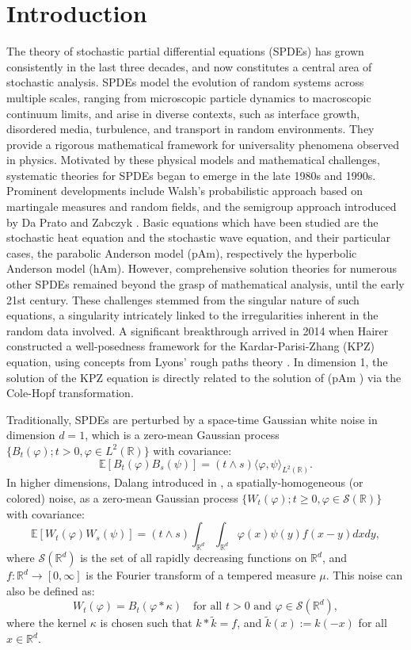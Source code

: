 \documentclass[12pt]{article}
\def\cS{\mathcal{S}}
\def\bE{\mathbb{E}}
\def\bR{\mathbb{R}}
\def\k{\kappa}
\begin{document}
\section{Introduction}

The theory of stochastic partial differential equations (SPDEs) has grown consistently in the last three decades, and now constitutes a central area of stochastic analysis. SPDEs model the evolution of random systems across multiple scales, ranging from microscopic particle dynamics to macroscopic continuum limits, and arise in diverse contexts, such as interface growth, disordered media, turbulence, and transport in random environments. They provide a rigorous mathematical framework for universality phenomena observed in physics. Motivated by these physical models and mathematical challenges, systematic theories for SPDEs began to emerge in the late 1980s and 1990s. Prominent developments include Walsh's \cite{walsh86} probabilistic approach based on martingale measures and random fields, and the semigroup approach introduced by Da Prato and Zabczyk \cite{DZ92}. Basic equations which have been studied are the stochastic heat equation and the stochastic wave equation, and their particular cases, the parabolic Anderson model (pAm), respectively the hyperbolic Anderson model (hAm). However, comprehensive solution theories for numerous other SPDEs
remained beyond the grasp of mathematical analysis, until the early 21st century. These challenges
stemmed from the singular nature of such equations, a singularity intricately linked to the irregularities inherent in the random data involved. A significant breakthrough arrived in 2014 when Hairer \cite{hairer14}
constructed a well-posedness framework for the Kardar-Parisi-Zhang (KPZ) equation, using concepts from Lyons' rough paths theory \cite{lyons98}. In dimension 1, the solution of the KPZ equation is directly related to the solution of (pAm
) via the Cole-Hopf transformation.


\medskip

Traditionally, SPDEs are perturbed by a space-time Gaussian white noise in dimension $d=1$, which is a zero-mean Gaussian process $\{B_t(\varphi);t> 0,\varphi \in L^2(\bR)\}$ with covariance:
\[
\bE[B_t(\varphi) B_s(\psi)]=(t \wedge s) \langle \varphi,\psi \rangle_{L^2(\bR)}.
\]
In higher dimensions, Dalang introduced in \cite{dalang99}, a spatially-homogeneous (or colored) noise, as a zero-mean Gaussian process $\{W_t(\varphi);t\geq 0,\varphi \in \cS(\bR)\}$ with covariance:
\begin{equation}
\label{def-cov-W}
\bE[W_t(\varphi) W_s(\psi)]=(t \wedge s) \int_{\bR^d} \int_{\bR^d}\varphi(x)\psi(y) f(x-y)dxdy,
\end{equation}
where $\cS(\bR^d)$ is the set of all rapidly decreasing functions on $\bR^d$, and $f:\bR^d \to [0,\infty]$ is the Fourier transform of a tempered measure $\mu$. This noise can also be defined as:
\begin{equation}
\label{Gauss-color}
W_t(\varphi)=B_t(\varphi*\k) \quad \mbox{for all $t>0$ and $\varphi \in \cS(\bR^d)$},
\end{equation}
where the kernel $\k$ is chosen such that $k * \widetilde{k}=f$, and $\widetilde{k}(x):=k(-x)$ for all $x \in \bR^d$.
\end{document}
